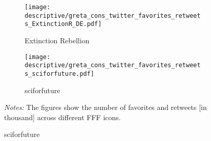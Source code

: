 \documentclass[11pt, a4paper]{article} %
\begin{document}
\begin{landscape}
\begin{figure}[H]
		\begin{subfigure}[h]{0.23\linewidth}\centering\caption{Extinction Rebellion}
			\texttt{[image: descriptive/greta\_cons\_twitter\_favorites\_retweets\_ExtinctionR\_DE.pdf]}
		\end{subfigure}
		\begin{subfigure}[h]{0.23\linewidth}\centering\caption{sciforfuture}
			\texttt{[image: descriptive/greta\_cons\_twitter\_favorites\_retweets\_sciforfuture.pdf]}
		\end{subfigure}
		\begin{minipage}{\linewidth}
			\scriptsize{\emph{Notes:} The figures show the number of favorites and retweets [in thousand] across different FFF icons.}
		\end{minipage}
	\end{figure}	
\end{landscape}
\end{document}
